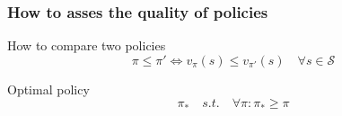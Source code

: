 \documentclass[dvipsnames,svgnames]{beamer}
\begin{document}
%




\begin{frame}
\frametitle{How to asses the quality of policies}
\begin{block}{How to compare two policies}
$$ \pi \leq \pi ' \iff  v_{\pi}(s) \leq v_{\pi'}(s) \quad \forall s \in \mathcal{S}
$$
\end{block}

\pause 

\begin{block}{Optimal policy}
$$ \pi_{*} \quad s.t. \quad \forall \pi : \pi_{*}\geq \pi $$
\end{block}
\end{frame}

\end{document}
